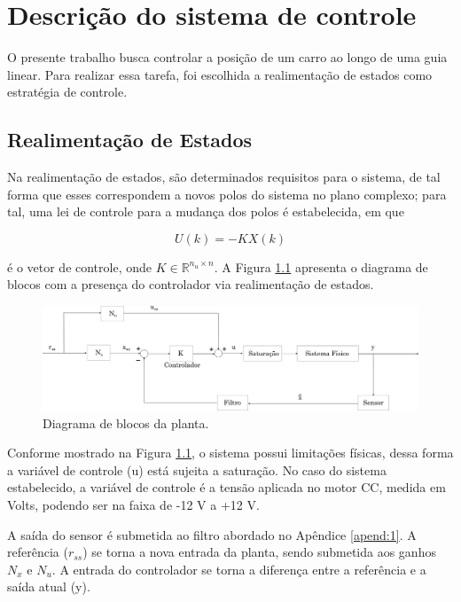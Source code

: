 \chapter{Descrição do sistema de controle}

O presente trabalho busca controlar a posição de um carro ao longo de uma guia linear. Para realizar essa tarefa, foi escolhida a realimentação de estados como estratégia de controle.

\section{Realimentação de Estados}

Na realimentação de estados, são determinados requisitos para o sistema, de tal forma que esses correspondem a novos polos do sistema no plano complexo; para tal, uma lei de controle para a mudança dos polos é estabelecida, em que  

\begin{equation}
    U(k) = -KX(k)
    \label{vetor_controle_realimentacao}
\end{equation}

\noindent é o vetor de controle, onde $K \in \mathbb{R}^{n_u \times n}$. A Figura \ref{fig:diagrama_blocos} apresenta o diagrama de blocos com a presença do controlador via realimentação de estados.

\begin{figure}[H]
    \centering
    \includegraphics[width=1\linewidth]{figuras/diagrama_blocos.png}
    \caption[Diagrama de blocos da planta]{Diagrama de blocos da planta.}
    \label{fig:diagrama_blocos}
\end{figure}

Conforme mostrado na Figura \ref{fig:diagrama_blocos}, o sistema possui limitações físicas, dessa forma a variável de controle (u) está sujeita a saturação. No caso do sistema estabelecido, a variável de controle é a tensão aplicada no motor CC, medida em Volts, podendo ser na faixa de -12 V a +12 V.

A saída do sensor é submetida ao filtro abordado no Apêndice \ref{apend:1}. A referência ($r_{ss}$) se torna a nova entrada da planta, sendo submetida aos ganhos $N_x$ e $N_u$. A entrada do controlador se torna a diferença entre a referência e a saída atual (y).


